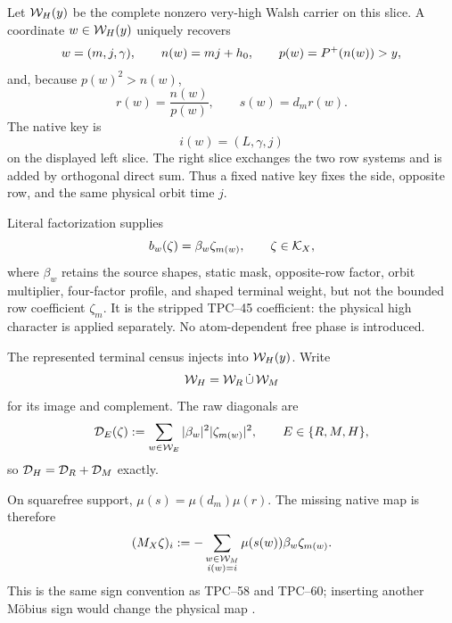 Let \(\mathcal W_H(y)\) be the complete nonzero very-high Walsh carrier on this
slice.  A coordinate \(w\in\mathcal W_H(y)\) uniquely recovers
\begin{equation}
 w=(m,j,\gamma),
 \qquad
 n(w)=mj+h_0,
 \qquad
 p(w)=P^{+}(n(w))>y,
 \label{eq:tpc61-recovered-mjp}
\end{equation}
and, because \(p(w)^2>n(w)\),
\begin{equation}
 r(w)=\frac{n(w)}{p(w)},
 \qquad
 s(w)=d_mr(w).
 \label{eq:tpc61-recovered-rs}
\end{equation}
The native key is
\begin{equation}
 i(w)=(L,\gamma,j)
 \label{eq:tpc61-native-key-left}
\end{equation}
on the displayed left slice.  The right slice exchanges the two row
systems and is added by orthogonal direct sum.  Thus a fixed native key
fixes the side, opposite row, and the same physical orbit time \(j\).

Literal factorization supplies
\begin{equation}
 b_w(\zeta)=\beta_w\zeta_{m(w)},
 \qquad \zeta\in\mathcal K_X,
 \label{eq:tpc61-literal-row-amplitude}
\end{equation}
where \(\beta_w\) retains the source shapes, static mask, opposite-row
factor, orbit multiplier, four-factor profile, and shaped terminal weight,
but not the bounded row coefficient \(\zeta_m\).  It is the stripped
TPC--45 coefficient: the physical high character is applied separately.
No atom-dependent free phase is introduced.

The represented terminal census injects into \(\mathcal W_H(y)\).  Write
\begin{equation}
 \mathcal W_H=\mathcal W_R\,\dot\cup\,\mathcal W_M
 \label{eq:tpc61-RM-partition}
\end{equation}
for its image and complement.  The raw diagonals are
\begin{equation}
 \mathcal D_E(\zeta)
 :=\sum_{w\in\mathcal W_E}|\beta_w|^2|\zeta_{m(w)}|^2,
 \qquad E\in\{R,M,H\},
 \label{eq:tpc61-raw-RMH-diagonals}
\end{equation}
so \(\mathcal D_H=\mathcal D_R+\mathcal D_M\) exactly.

On squarefree support, \(\mu(s)=\mu(d_m)\mu(r)\).  The missing native map
is therefore
\begin{equation}
 (M_X\zeta)_i
 :=-\sum_{\substack{w\in\mathcal W_M\\i(w)=i}}
       \mu(s(w))\beta_w\zeta_{m(w)}.
 \label{eq:tpc61-missing-native-map}
\end{equation}
This is the same sign convention as TPC--58 and TPC--60; inserting another
M\"obius sign would change the physical map \citep{WangTPC58,WangTPC60}.

